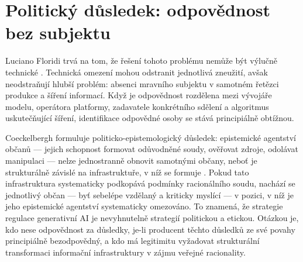 \section{Politický důsledek: odpovědnost bez subjektu}

Luciano Floridi trvá na tom, že řešení tohoto problému nemůže být výlučně technické \parencite{Floridi23}.
Technická omezení mohou odstranit jednotlivá zneužití, avšak neodstraňují hlubší problém: absenci mravního subjektu v samotném řetězci produkce a šíření informací.
Když je odpovědnost rozdělena mezi vývojáře modelu, operátora platformy, zadavatele konkrétního sdělení a algoritmus uskutečňující šíření, identifikace odpovědné osoby se stává principiálně obtížnou.

Coeckelbergh formuluje politicko-epistemologický důsledek: epistemické agentství občanů — jejich schopnost formovat odůvodněné soudy, ověřovat zdroje, odolávat manipulaci — nelze jednostranně obnovit samotnými občany, neboť je strukturálně závislé na infrastruktuře, v níž se formuje \parencite{Coeckelbergh23}.
Pokud tato infrastruktura systematicky podkopává podmínky racionálního soudu, nachází se jednotlivý občan — byť sebelépe vzdělaný a kriticky myslící — v pozici, v níž je jeho epistemické agentství systematicky omezováno.
To znamená, že strategie regulace generativní AI je nevyhnutelně strategií politickou a etickou.
Otázkou je, kdo nese odpovědnost za důsledky, je-li producent těchto důsledků ze své povahy principiálně bezodpovědný, a kdo má legitimitu vyžadovat strukturální transformaci informační infrastruktury v zájmu veřejné racionality.


